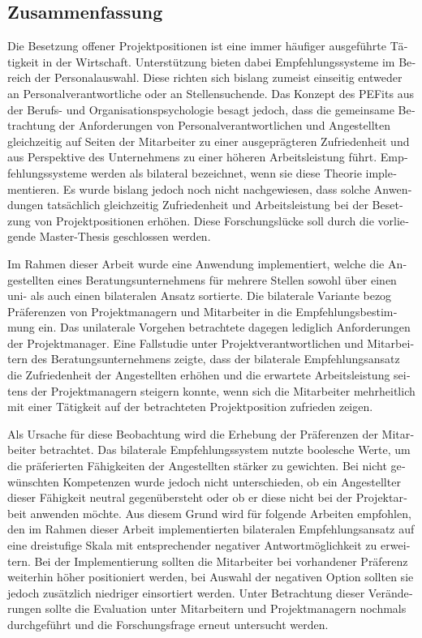 \begin{otherlanguage}{ngerman}
\chapter*{Zusammenfassung}
Die Besetzung offener Projektpositionen ist eine immer häufiger ausgeführte Tätigkeit in der Wirtschaft. Unterstützung bieten dabei Empfehlungssysteme im Bereich der Personalauswahl. Diese richten sich bislang zumeist einseitig entweder an Personalverantwortliche oder an Stellensuchende. Das Konzept des \aclp{PEFit} aus der Berufs- und Organisationspsychologie besagt jedoch, dass die gemeinsame Betrachtung der Anforderungen von Personalverantwortlichen und Angestellten gleichzeitig auf Seiten der Mitarbeiter zu einer ausgeprägteren Zufriedenheit und aus Perspektive des Unternehmens zu einer höheren Arbeitsleistung führt. Empfehlungssysteme werden als bilateral bezeichnet, wenn sie diese Theorie implementieren. Es wurde bislang jedoch noch nicht nachgewiesen, dass solche Anwendungen tatsächlich gleichzeitig Zufriedenheit und Arbeitsleistung bei der Besetzung von Projektpositionen erhöhen. Diese Forschungslücke soll durch die vorliegende Master-Thesis geschlossen werden.

Im Rahmen dieser Arbeit wurde eine Anwendung implementiert, welche die Angestellten eines Beratungsunternehmens für mehrere Stellen sowohl über einen uni- als auch einen bilateralen Ansatz sortierte. Die bilaterale Variante bezog Präferenzen von Projektmanagern und Mitarbeiter in die Empfehlungsbestimmung ein. Das unilaterale Vorgehen betrachtete dagegen lediglich Anforderungen der Projektmanager. Eine Fallstudie unter Projektverantwortlichen und Mitarbeitern des Beratungsunternehmens zeigte, dass der bilaterale Empfehlungsansatz die Zufriedenheit der Angestellten erhöhen und die erwartete Arbeitsleistung seitens der Projektmanagern steigern konnte, wenn sich die Mitarbeiter mehrheitlich mit einer Tätigkeit auf der betrachteten Projektposition zufrieden zeigen.

Als Ursache für diese Beobachtung wird die Erhebung der Präferenzen der Mitarbeiter betrachtet. Das bilaterale Empfehlungssystem nutzte boolesche Werte, um die präferierten Fähigkeiten der Angestellten stärker zu gewichten. Bei nicht gewünschten Kompetenzen wurde jedoch nicht unterschieden, ob ein Angestellter dieser Fähigkeit neutral gegenübersteht oder ob er diese nicht bei der Projektarbeit anwenden möchte. Aus diesem Grund wird für folgende Arbeiten empfohlen, den im Rahmen dieser Arbeit implementierten bilateralen Empfehlungsansatz auf eine dreistufige Skala mit entsprechender negativer Antwortmöglichkeit zu erweitern. Bei der Implementierung sollten die Mitarbeiter bei vorhandener Präferenz weiterhin höher positioniert werden, bei Auswahl der negativen Option sollten sie jedoch zusätzlich niedriger einsortiert werden. Unter Betrachtung dieser Veränderungen sollte die Evaluation unter Mitarbeitern und Projektmanagern nochmals durchgeführt und die Forschungsfrage erneut untersucht werden.
\end{otherlanguage}

